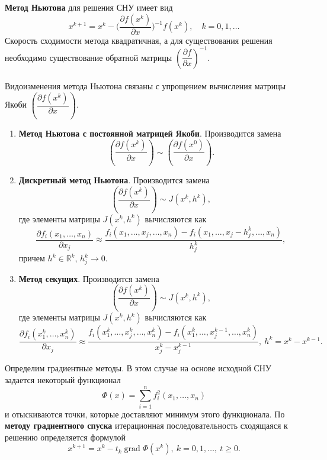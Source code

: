\documentclass[a4paper, 12pt]{report}
\numberwithin{equation}{section}
\renewcommand{\geq}{\geqslant}
\renewcommand{\d}{\partial}
\begin{document}
	\textbf{Метод Ньютона} для решения СНУ имеет вид
	\begin{equation}
		x^{k+1} = x^k - \Big(\dfrac{\partial f(x^k)}{\partial x}\Big)^{-1}f(x^k),\quad k=0,1,\ldots
	\end{equation}
	Скорость сходимости метода квадратичная, а для существования решения необходимо существование обратной матрицы $\left(\dfrac{\d f}{\d x}\right)^{-1}$.
	\\\\
	Видоизменения метода Ньютона связаны с упрощением вычисления матрицы Якоби $\left(\dfrac{\d f(x^k)}{\d x}\right)$.
	\begin{enumerate}
		\item \textbf{Метод Ньютона с постоянной матрицей Якоби}. 
		Производится замена 
		\begin{equation}
			\left(\dfrac{\d f(x^k)}{\d x}\right)\sim \left(\dfrac{\d f(x^0)}{\d x}\right).
		\end{equation}
		\item \textbf{Дискретный метод Ньютона}.
		Производится замена 
		\begin{equation}
			\left(\dfrac{\d f(x^k)}{\d x}\right)\sim J(x^k, h^k),
		\end{equation}
		где элементы матрицы $J(x^k, h^k)$ вычисляются как 
		$$\dfrac{\d f_i(x_1,\ldots, x_n)}{\d x_j} \approx \dfrac{f_i(x_1,\ldots, x_j,\ldots, x_n) - f_i(x_1,\ldots, x_j-h_j^k,\ldots, x_n)}{h_j^k},$$
		причем $h^k \in \mathbb R^k$, $h_j^k \to 0$.
		\item \textbf{Метод секущих}.
		Производится замена 
		\begin{equation}
			\left(\dfrac{\d f(x^k)}{\d x}\right)\sim J(x^k, h^k),
		\end{equation}
		где элементы матрицы $J(x^k, h^k)$ вычисляются как 
		$$\dfrac{\d f_i(x_1^k,\ldots, x_n^k)}{\d x_j}\approx \dfrac{ f_i(x_1^k,\ldots, x_j^k,\ldots, x_n^k) - f_i(x_1^k,\ldots, x_j^{k-1},\ldots, x_n^k)}{x_j^k - x_j^{k-1}},\ h^k=x^k - x^{k-1}.$$
	\end{enumerate}
	Определим градиентные методы. В этом случае на основе исходной СНУ задается некоторый функционал
	\begin{equation}
		\Phi(x) = \sum_{i=1}^n f_i^2(x_1,\ldots, x_n)
	\end{equation}
	и отыскиваются точки, которые доставляют минимум этого функционала. По \textbf{методу градиентного спуска} итерационная последовательность сходящаяся к решению определяется формулой 
	\begin{equation}
		x^{k+1} = x^k - t_k\operatorname{grad} \Phi(x^k),\ k=0,1,\ldots,\ t\geq 0.
	\end{equation}
\end{document}
